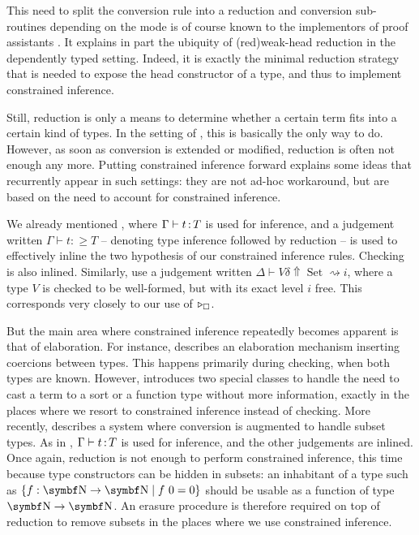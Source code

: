 This need to split the conversion rule into a reduction and conversion sub-routines depending on the mode is of course known to the implementors of proof assistants .
It explains in part the ubiquity of \kl(red){weak-head} reduction
in the dependently typed setting.
Indeed, it is exactly the minimal reduction strategy that is needed to expose the
head constructor of a type, and thus to implement constrained inference.

Still, reduction is only a means to determine whether a certain term fits into
a certain kind of types. In the setting of , this is basically the only way to do.
However, as soon as conversion is extended or modified,
reduction is often not enough any more.
Putting constrained inference forward explains some ideas that recurrently appear in
such settings:  they are not ad-hoc workaround,
but are based on the need to account for constrained inference.

We already mentioned , where $\Gamma \vdash t \operatorname{:} T$ is used
for inference, and a judgement written $\Gamma \vdash t \mathrel{:\geq} T$ –
denoting type inference followed by reduction –
is used to effectively inline the two hypothesis of our constrained inference rules.
Checking is also inlined.
Similarly,  use a judgement written $\Delta \vdash V \delta \Uparrow \operatorname{Set} \rightsquigarrow i$, where a type $V$ is checked to be well-formed, but with its exact level $i$ free. This corresponds very closely to our use of $\pity{\uni}$.

But the main area where constrained inference repeatedly becomes apparent is that of
elaboration. For instance,
 describes an elaboration mechanism inserting coercions between types.
This happens primarily during checking, when both types are known.
However, \citeauthor{Saibi1997} introduces two special classes to handle the need
to cast a term to a sort or a function type without more information,
exactly in the places where we resort to constrained inference instead of checking.
More recently,  describes a system where conversion is augmented
to handle subset types.
As in \textcite{Pollack1992}, $\Gamma \vdash t \operatorname{:} T$ is used for inference,
and the other judgements are inlined.
Once again, reduction is not enough to perform constrained inference, this time
because type constructors can be hidden in subsets:
an inhabitant of a type such as $\{f : \Nat \to \Nat \mid f\ 0 = 0 \}$
should be usable as a function of type $\Nat \to \Nat$.
An erasure procedure is therefore required on top of reduction to remove subsets in the places where we use constrained inference.

